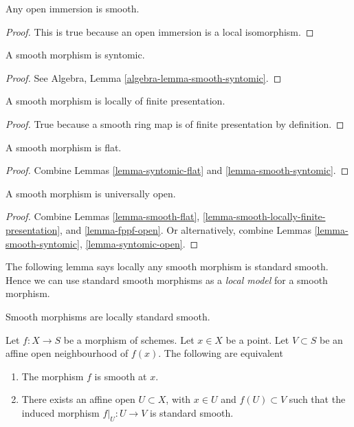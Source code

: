 \begin{lemma}
\label{lemma-open-immersion-smooth}
Any open immersion is smooth.
\end{lemma}

\begin{proof}
This is true because an open immersion is a local isomorphism.
\end{proof}

\begin{lemma}
\label{lemma-smooth-syntomic}
A smooth morphism is syntomic.
\end{lemma}

\begin{proof}
See Algebra, Lemma \ref{algebra-lemma-smooth-syntomic}.
\end{proof}

\begin{lemma}
\label{lemma-smooth-locally-finite-presentation}
A smooth morphism is locally of finite presentation.
\end{lemma}

\begin{proof}
True because a smooth ring map is of finite presentation by
definition.
\end{proof}

\begin{lemma}
\label{lemma-smooth-flat}
A smooth morphism is flat.
\end{lemma}

\begin{proof}
Combine Lemmas \ref{lemma-syntomic-flat} and \ref{lemma-smooth-syntomic}.
\end{proof}

\begin{lemma}
\label{lemma-smooth-open}
A smooth morphism is universally open.
\end{lemma}

\begin{proof}
Combine
Lemmas \ref{lemma-smooth-flat},
\ref{lemma-smooth-locally-finite-presentation}, and
\ref{lemma-fppf-open}.
Or alternatively, combine
Lemmas \ref{lemma-smooth-syntomic},
\ref{lemma-syntomic-open}.
\end{proof}

\noindent
The following lemma says locally any smooth morphism is standard smooth.
Hence we can use standard smooth morphisms as a {\it local model}
for a smooth morphism.

\begin{lemma}
\label{lemma-smooth-locally-standard-smooth}
\begin{slogan}
Smooth morphisms are locally standard smooth.
\end{slogan}
Let $f : X  \to S$ be a morphism of schemes.
Let $x \in X$ be a point.
Let $V \subset S$ be an affine open neighbourhood of $f(x)$.
The following are equivalent
\begin{enumerate}
\item The morphism $f$ is smooth at $x$.
\item There exists an affine open $U \subset X$,
with $x \in U$ and $f(U) \subset V$ such that the
induced morphism $f|_U : U \to V$ is standard smooth.
\end{enumerate}
\end{lemma}

